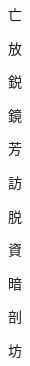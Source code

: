 {\Huge \begin{CJK}{UTF8}{min} 亡\end{CJK}}\hspace{0.1cm}
{\Huge \begin{CJK}{UTF8}{min} 放\end{CJK}}\hspace{0.1cm}
{\Huge \begin{CJK}{UTF8}{min} 鋭\end{CJK}}\hspace{0.1cm}
{\Huge \begin{CJK}{UTF8}{min} 鏡\end{CJK}}\hspace{0.1cm}
{\Huge \begin{CJK}{UTF8}{min} 芳\end{CJK}}\hspace{0.1cm}
{\Huge \begin{CJK}{UTF8}{min} 訪\end{CJK}}\hspace{0.1cm}
{\Huge \begin{CJK}{UTF8}{min} 脱\end{CJK}}\hspace{0.1cm}
{\Huge \begin{CJK}{UTF8}{min} 資\end{CJK}}\hspace{0.1cm}
{\Huge \begin{CJK}{UTF8}{min} 暗\end{CJK}}\hspace{0.1cm}
{\Huge \begin{CJK}{UTF8}{min} 剖\end{CJK}}\hspace{0.1cm}
{\Huge \begin{CJK}{UTF8}{min} 坊\end{CJK}}\hspace{0.1cm}
\cleardoublepage
 \onecolumn 
